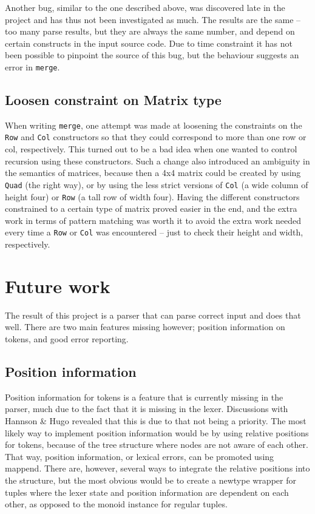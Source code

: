 \documentclass[a4paper,12pt,twosided]{report}
\begin{document}
Another bug, similar to the one described above, was discovered late in the
project and has thus not been investigated as much. The results are the same --
too many parse results, but they are always the same number, and depend on
certain constructs in the input source code. Due to time constraint it has not
been possible to pinpoint the source of this bug, but the behaviour suggests an
error in \texttt{merge}. \label{branchbug}

\subsection{Loosen constraint on Matrix type}
When writing \texttt{merge}, one attempt was made at loosening the constraints
on the \texttt{Row} and \texttt{Col} constructors so that they could correspond
to more than one row or col, respectively. This turned out to be a bad idea when
one wanted to control recursion using these constructors. Such a change also
introduced an ambiguity in the semantics of matrices, because then a 4x4 matrix
could be created by using \texttt{Quad} (the right way), or by using the less
strict versions of \texttt{Col} (a wide column of height four) or \texttt{Row}
(a tall row of width four). Having the different constructors constrained to a
certain type of matrix proved easier in the end, and the extra work in terms of
pattern matching was worth it to avoid the extra work needed every time a
\texttt{Row} or \texttt{Col} was encountered -- just to check their height and
width, respectively.  

\section{Future work}
The result of this project is a parser that can parse correct input and does
that well. There are two main features missing however; position information on
tokens, and good error reporting.

\subsection{Position information}
Position information for tokens is a feature that is currently missing in the
parser, much due to the fact that it is missing in the lexer. Discussions with
Hannson \& Hugo revealed that this is due to that not being a priority. The
most likely way to implement position information would be by using relative
positions for tokens, because of the tree structure where nodes are not aware of
each other. That way, position information, or lexical errors, can be promoted
using mappend. There are, however, several ways to integrate the relative
positions into the structure, but the most obvious would be to create a newtype
wrapper for tuples where the lexer state and position information are dependent
on each other, as opposed to the monoid instance for regular tuples. 
\end{document}
